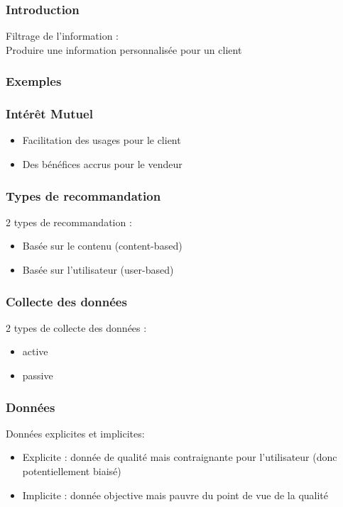 \begin{frame}
  \frametitle{Introduction}
  Filtrage de l'information : \\
  \newline
  Produire une information personnalisée pour un \og client\fg
\end{frame}

\begin{frame}
  \frametitle{Exemples}
  \begin{minipage}[l]{0.33\linewidth}
  \end{minipage}\hfill
  \begin{minipage}[l]{0.33\linewidth}
  \end{minipage}\hfill
  \begin{minipage}[l]{0.33\linewidth}
  \end{minipage}\hfill
\end{frame}

\begin{frame}
  \frametitle{Intérêt Mutuel}
  \begin{itemize}
  \item Facilitation des usages pour le \og client\fg
  \item Des bénéfices accrus pour le \og vendeur\fg
  \end{itemize}
\end{frame}

\begin{frame}
  \frametitle{Types de recommandation}
  2 types de recommandation :
  \begin{itemize}
  \item Basée sur le contenu (content-based)
  \item Basée sur l'utilisateur (user-based)
  \end{itemize}
\end{frame}

\begin{frame}
  \frametitle{Collecte des données}
  2 types de collecte des données : 
  \begin{itemize}
  \item active
  \item passive
  \end{itemize}
\end{frame}

\begin{frame}
  \frametitle{Données}
  Données explicites et implicites:
  \begin{itemize}
    \item Explicite : donnée de qualité mais contraignante pour l'utilisateur (donc potentiellement biaisé)\\
    \item Implicite : donnée objective mais pauvre du point de vue de la qualité  
  \end{itemize}
\end{frame}

